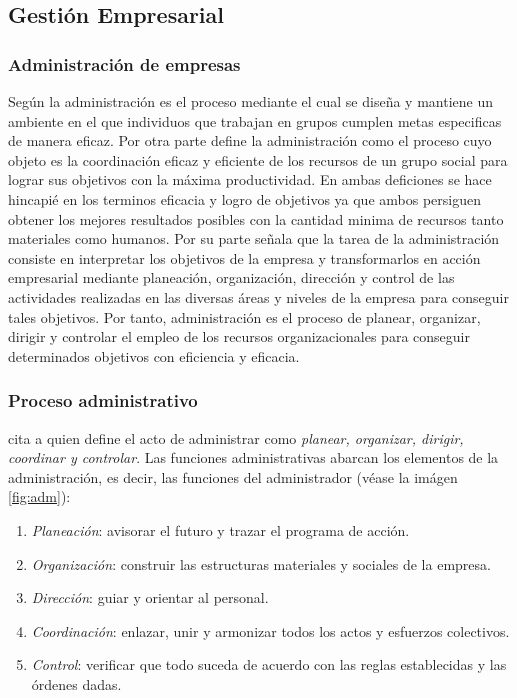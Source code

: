 \subsection{Gesti\'on Empresarial}
\subsubsection{Administraci\'on de empresas}
Seg\'un \cite{koontz} la administraci\'on es el proceso mediante el cual se dise\~na
y mantiene un ambiente en el que individuos que trabajan en grupos cumplen metas
especificas de manera eficaz. Por otra parte \citep{galindo} define la administraci\'on
como el proceso cuyo objeto es la coordinaci\'on eficaz y eficiente de los recursos
de un grupo social para lograr sus objetivos con la m\'axima productividad.
En ambas deficiones se hace hincapi\'e en los terminos eficacia y logro de objetivos
ya que ambos persiguen obtener los mejores resultados posibles con la cantidad
minima de recursos tanto materiales como humanos. Por su parte \citep{chiavenato}
se\~nala que la tarea de la administraci\'on consiste en interpretar los objetivos
de la empresa y transformarlos en acci\'on empresarial mediante planeaci\'on, organizaci\'on,
direcci\'on y control de las actividades realizadas en las diversas \'areas y niveles
de la empresa para conseguir tales objetivos. Por tanto, administraci\'on es el
proceso de planear, organizar, dirigir y controlar el empleo de los recursos
organizacionales para conseguir determinados objetivos con eficiencia y eficacia.

\subsubsection{Proceso administrativo}
\cite{chiavenato} cita a \citep{fayol} quien define el acto de administrar como
\emph{planear, organizar, dirigir, coordinar y controlar}. Las funciones administrativas
abarcan los elementos de la administraci\'on, es decir, las funciones del administrador
(v\'ease la im\'agen \ref{fig:adm}):
\begin{enumerate}
    \item \emph{Planeaci\'on}: avisorar el futuro y trazar el programa de acci\'on.
    \item \emph{Organizaci\'on}: construir las estructuras materiales y sociales de
          la empresa.
    \item \emph{Direcci\'on}: guiar y orientar al personal.
    \item \emph{Coordinaci\'on}: enlazar, unir y armonizar todos los actos y esfuerzos
          colectivos.
    \item \emph{Control}: verificar que todo suceda de acuerdo con las reglas establecidas
          y las \'ordenes dadas.
\end{enumerate}

